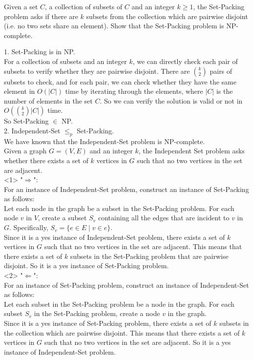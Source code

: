 \problem{}

Given a set $C$, a collection of subsets of $C$ and an integer $k \geq 1$, the Set-Packing problem asks if there are $k$ subsets from the collection which are pairwise disjoint (i.e. no two sets share an element). Show that the Set-Packing problem is NP-complete.

\solution{}

1. Set-Packing is in NP.\\
For a collection of subsets and an integer \( k \), we can directly check each pair of subsets to verify whether they are pairwise disjoint. There are \( \binom{k}{2} \) pairs of subsets to check, and for each pair, we can check whether they have the same element in $O(|C|)$ time by iterating through the elements, where $|C|$ is the number of elements in the set $C$. So we can verify the solution is valid or not in $O\left(\binom{k}{2}|C|\right)$ time.\\
So Set-Packing $\in$ NP.\\

2. Independent-Set $\leq_p$ Set-Packing.\\
We have known that the Independent-Set problem is NP-complete.\\
Given a graph \( G = (V, E) \) and an integer \( k \), the Independent Set problem asks whether there exists a set of \( k \) vertices in \( G \) such that no two vertices in the set are adjacent.\\

<1> "$\Rightarrow$":\\
For an instance of Independent-Set problem, construct an instance of Set-Packing as follows:\\
Let each node in the graph be a subset in the Set-Packing problem. For each node \( v \) in \( V \), create a subset \( S_v \) containing all the edges that are incident to \( v \) in \( G \). Specifically, \( S_v = \{e \in E \mid v \in e\} \).\\
Since it is a yes instance of Independent-Set problem, there exists a set of \( k \) vertices in \( G \) such that no two vertices in the set are adjacent. This means that there exists a set of \( k \) subsets in the Set-Packing problem that are pairwise disjoint. So it is a yes instance of Set-Packing problem.\\

<2> "$\Leftarrow$":\\
For an instance of Set-Packing problem, construct an instance of Independent-Set as follows:\\
Let each subset in the Set-Packing problem be a node in the graph. For each subset \( S_v \) in the Set-Packing problem, create a node \( v \) in the graph.\\
Since it is a yes instance of Set-Packing problem, there exists a set of \( k \) subsets in the collection which are pairwise disjoint. This means that there exists a set of \( k \) vertices in \( G \) such that no two vertices in the set are adjacent. So it is a yes instance of Independent-Set problem.\\

